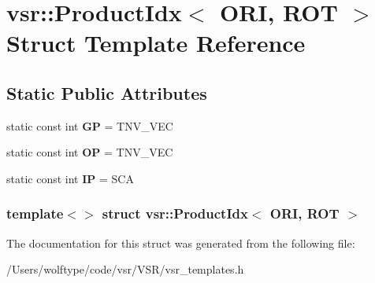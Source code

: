 \hypertarget{structvsr_1_1_product_idx_3_01_o_r_i_00_01_r_o_t_01_4}{\section{vsr\-:\-:Product\-Idx$<$ O\-R\-I, R\-O\-T $>$ Struct Template Reference}
\label{structvsr_1_1_product_idx_3_01_o_r_i_00_01_r_o_t_01_4}
}
\subsection*{Static Public Attributes}
\begin{DoxyCompactItemize}
\item 
\hypertarget{structvsr_1_1_product_idx_3_01_o_r_i_00_01_r_o_t_01_4_a0cd1567ecc43405a09883b4de2fa0c82}{static const int {\bfseries G\-P} = T\-N\-V\-\_\-\-V\-E\-C}\label{structvsr_1_1_product_idx_3_01_o_r_i_00_01_r_o_t_01_4_a0cd1567ecc43405a09883b4de2fa0c82}

\item 
\hypertarget{structvsr_1_1_product_idx_3_01_o_r_i_00_01_r_o_t_01_4_a900e043a266d71bc5266ee5708c515ad}{static const int {\bfseries O\-P} = T\-N\-V\-\_\-\-V\-E\-C}\label{structvsr_1_1_product_idx_3_01_o_r_i_00_01_r_o_t_01_4_a900e043a266d71bc5266ee5708c515ad}

\item 
\hypertarget{structvsr_1_1_product_idx_3_01_o_r_i_00_01_r_o_t_01_4_a6c750dbcdad2d81be95b2153ace1b17a}{static const int {\bfseries I\-P} = S\-C\-A}\label{structvsr_1_1_product_idx_3_01_o_r_i_00_01_r_o_t_01_4_a6c750dbcdad2d81be95b2153ace1b17a}

\end{DoxyCompactItemize}
\subsubsection*{template$<$$>$ struct vsr\-::\-Product\-Idx$<$ O\-R\-I, R\-O\-T $>$}



The documentation for this struct was generated from the following file\-:\begin{DoxyCompactItemize}
\item 
/\-Users/wolftype/code/vsr/\-V\-S\-R/vsr\-\_\-templates.\-h\end{DoxyCompactItemize}
